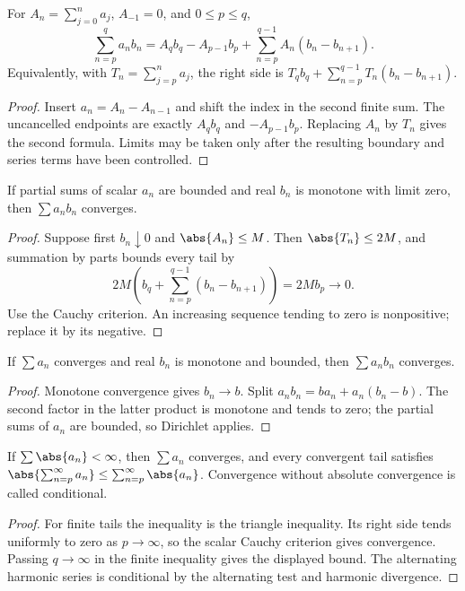 \begin{theorem}
For $A_n=\sum_{j=0}^n a_j$, $A_{-1}=0$, and $0\leq p\leq q$,
\[\sum_{n=p}^q a_nb_n=A_qb_q-A_{p-1}b_p+\sum_{n=p}^{q-1}A_n(b_n-b_{n+1}).\]
Equivalently, with $T_n=\sum_{j=p}^n a_j$, the right side is $T_qb_q+\sum_{n=p}^{q-1}T_n(b_n-b_{n+1})$.
\end{theorem}
\begin{proof}
Insert $a_n=A_n-A_{n-1}$ and shift the index in the second finite sum. The uncancelled endpoints are exactly $A_qb_q$ and $-A_{p-1}b_p$. Replacing $A_n$ by $T_n$ gives the second formula. Limits may be taken only after the resulting boundary and series terms have been controlled.
\end{proof}

\begin{theorem}
If partial sums of scalar $a_n$ are bounded and real $b_n$ is monotone with limit zero, then $\sum a_nb_n$ converges.
\end{theorem}
\begin{proof}
Suppose first $b_n\downarrow0$ and $\abs{A_n}\leq M$. Then $\abs{T_n}\leq2M$, and summation by parts bounds every tail by
\[2M\left(b_q+\sum_{n=p}^{q-1}(b_n-b_{n+1})\right)=2Mb_p\longrightarrow0.\]
Use the Cauchy criterion. An increasing sequence tending to zero is nonpositive; replace it by its negative.
\end{proof}

\begin{theorem}
If $\sum a_n$ converges and real $b_n$ is monotone and bounded, then $\sum a_nb_n$ converges.
\end{theorem}
\begin{proof}
Monotone convergence gives $b_n\to b$. Split $a_nb_n=ba_n+a_n(b_n-b)$. The second factor in the latter product is monotone and tends to zero; the partial sums of $a_n$ are bounded, so Dirichlet applies.
\end{proof}

\begin{theorem}
If $\sum\abs{a_n}<\infty$, then $\sum a_n$ converges, and every convergent tail satisfies $\abs{\sum_{n=p}^\infty a_n}\leq\sum_{n=p}^\infty\abs{a_n}$. Convergence without absolute convergence is called conditional.
\end{theorem}
\begin{proof}
For finite tails the inequality is the triangle inequality. Its right side tends uniformly to zero as $p\to\infty$, so the scalar Cauchy criterion gives convergence. Passing $q\to\infty$ in the finite inequality gives the displayed bound. The alternating harmonic series is conditional by the alternating test and harmonic divergence.
\end{proof}

